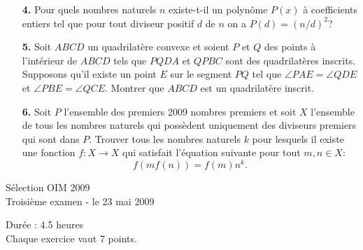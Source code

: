 \documentclass[12pt,a4paper]{article}
\theoremstyle{plain}
\theoremstyle{definition}
\theoremstyle{remark}
\begin{document}
\begin{enumerate}

\item[\textbf{4.}] Pour quels nombres naturels $n$ existe-t-il un polyn\^ome $P(x)$ \`a coefficients entiers tel que
pour tout diviseur positif $d$ de $n$ on a $P(d)=(n/d)^2$?\\

\bigskip
\bigskip

\item[\textbf{5.}] Soit $ABCD$ un quadrilat\`ere convexe et soient $P$ et $Q$ des points \`a l'int\'erieur de $ABCD$ tels que $PQDA$ et $QPBC$ sont des quadrilat\`eres inscrits. Supposons qu'il existe un point $E$ sur le segment $PQ$ tel que $\angle PAE = \angle QDE$ et $\angle PBE = \angle QCE$. Montrer que $ABCD$ est un quadrilat\`ere inscrit.

\bigskip
\bigskip

\item[\textbf{6.}] Soit $P$ l'ensemble des premiers 2009 nombres premiers et soit $X$ l'ensemble de tous les nombres naturels qui  poss\`edent uniquement des diviseurs premiers qui sont dans $P$. Trouver tous les nombres naturels $k$ pour lesquels il existe une fonction $f: X\rightarrow X$ qui satisfait l'\'equation suivante pour tout $m,n\in X$:
\[f(mf(n))=f(m)n^k.\]
 
\end{enumerate}


\pagebreak


\begin{center}
{\huge S\'election OIM 2009} \\
\medskip Troisi\`eme examen - le 23 mai 2009
\end{center}
\vspace{8mm}
Dur\'ee : 4.5 heures\\
Chaque exercice vaut 7 points.

\vspace{15mm}
\end{document}
